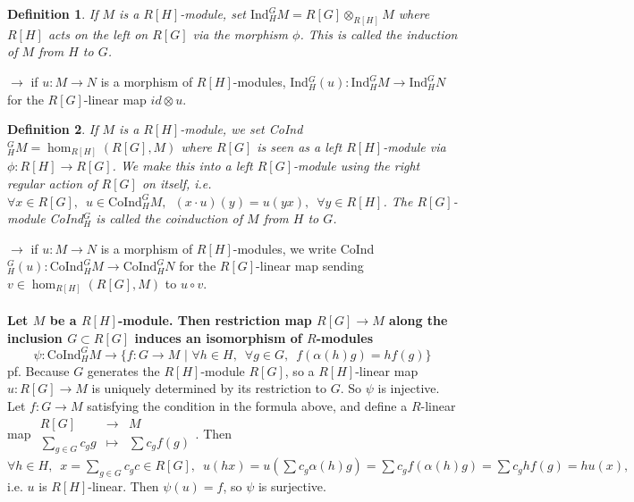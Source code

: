 \documentclass[12pt,letterpaper]{report}
\newtheorem{definition}{Definition}[section]
\begin{document}
\begin{definition}If $M$ is a $R[H]$-module, set $\text{Ind}_{H}^{G}M=R[G]\otimes_{R[H]}M$ where $R[H]$ acts on the left on $R[G]$ via the morphism $\phi$. This is called the induction of $M$ from $H$ to $G$.
\end{definition}
$\rightarrow $ if $u:M\rightarrow N$ is a morphism of $R[H]$-modules, Ind$_{H}^{G}(u):\text{Ind}_{H}^{G}M\rightarrow\text{Ind}_{H}^{G}N$ for the $R[G]$-linear map $id\otimes u$. 
\begin{definition}If $M$ is a $R[H]$-module, we set CoInd$_{H}^{G}M=\hom_{R[H]}(R[G],M)$ where $R[G]$ is seen as a left $R[H]$-module via $\phi:R[H]\rightarrow R[G]$. We make this into a left $R[G]$-module using the right regular action of $R[G]$ on itself, i.e. $\forall x\in R[G],\,\,\,u\in\text{CoInd}_{H}^{G}M,\,\,\,(x\cdot u)(y)=u(yx),\,\,\,\forall y\in R[H]$. The $R[G]$-module CoInd$_{H}^{G}$ is called the coinduction of $M$ from $H$ to $G$.\end{definition}
$\rightarrow$ if $u:M\rightarrow N$ is a morphism of $R[H]$-modules, we write CoInd$_{H}^{G}(u):\text{CoInd}_{H}^{G}M\rightarrow \text{CoInd}_{H}^{G}N$ for the $R[G]$-linear map sending $v\in\hom_{R[H]}(R[G],M)$ to $u\circ v$.
\\\\\textbf{Let $M$ be a $R[H]$-module. Then restriction map $R[G]\rightarrow M$ along the inclusion $G\subset R[G]$ induces an isomorphism of $R$-modules}\begin{equation*}\psi:\text{CoInd}_{H}^{G}M\rightarrow\{f:G\rightarrow M\,\,|\,\,\forall h\in H,\,\,\,\forall g\in G,\,\,\,f(\alpha(h)g)=hf(g)\}\end{equation*}
pf. Because $G$ generates the $R[H]$-module $R[G]$, so a $R[H]$-linear map $u:R[G]\rightarrow M$ is uniquely determined by its restriction to $G$. So $\psi$ is injective. Let $f:G\rightarrow M$ satisfying the condition in the formula above, and define a $R$-linear map $\begin{array}{rrr}R[G]&\rightarrow&M\\\sum_{g\in G}c_{g}g&\mapsto&\sum c_{g}f(g)\end{array}$. Then $\forall h\in H,\,\,\,x=\sum_{g\in G}c_{g}c\in R[G],\,\,\,u(hx)=u(\sum c_{g}\alpha(h)g)=\sum c_{g}f(\alpha(h)g)=\sum c_{g}hf(g)=hu(x),$ i.e. $u$ is $R[H]$-linear. Then $\psi(u)=f$, so $\psi$ is surjective. 
\end{document}
